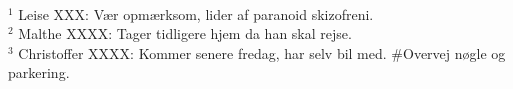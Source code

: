 
\underline{\hspace{3.5cm}}\\
$^1$ Leise XXX: Vær opmærksom, lider af paranoid skizofreni.\\
$^2$ Malthe XXXX: Tager tidligere hjem da han skal rejse.\\
$^3$ Christoffer XXXX: Kommer senere fredag, har selv bil med. \#Overvej nøgle og parkering.
